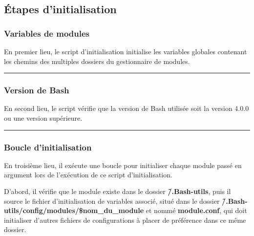 \documentclass[a4paper,10pt]{article}
\begin{document}
\color{green}
\subsection{Étapes d'initialisation}\color{white}

\color{blue}
\subsubsection{Variables de modules}\color{white}

\begin{justify}
    En premier lieu, le script d'initialisation initialise les variables globales contenant les chemins des multiples dossiers du gestionnaire de modules.
\end{justify}



\color{blue}\par\noindent\rule{\textwidth}{0.4pt}\color{white}

\color{blue}
\subsubsection{Version de Bash}\color{white}

\begin{justify}
    En second lieu, le script vérifie que la version de Bash utilisée soit la version 4.0.0 ou une version supérieure.
\end{justify}




\color{blue}\par\noindent\rule{\textwidth}{0.4pt}\color{white}

\color{blue}
\subsubsection{Boucle d'initialisation}\color{white}

\begin{justify}
    En troisième lieu, il exécute une boucle pour initialiser chaque module passé en argument lors de l'exécution de ce script d'initialisation.
\end{justify}

\begin{justify}
    D'abord, il vérifie que le module existe dans le dossier \textbf{\color{lime}\~/.Bash-utils}, puis il source le fichier d'initialisation de variables associé, situé dans le dossier \textbf{\color{lime}\~/.Bash-utils/config/modules/\$nom\_du\_module} et nommé \textbf{\color{lime}module.conf}, qui doit initialiser d'autres fichiers de configurations à placer de préférence dans ce même dossier.
\end{justify}
\end{document}
